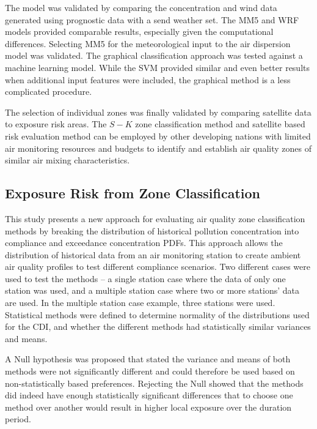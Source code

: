 The model was validated by comparing the concentration and wind data generated using prognostic data with a send weather set. The MM5 and WRF models provided comparable results, especially given the computational differences. Selecting MM5 for the meteorological input to the air dispersion model was validated. The graphical classification approach was tested against a machine learning model. While the SVM provided similar and even better results when additional input features were included, the graphical method is a less complicated procedure.

The selection of individual zones was finally validated by comparing satellite data to exposure risk areas.  The $S-K$ zone classification method and satellite based risk evaluation method can be employed by other developing nations with limited air monitoring resources and budgets to identify and establish air quality zones of similar air mixing characteristics.

\subsection{Exposure Risk from Zone Classification}

This study presents a new approach for evaluating air quality zone classification methods by breaking the distribution of historical pollution concentration into compliance and exceedance concentration PDFs. This approach allows the distribution of historical data from an air monitoring station to create ambient air quality profiles to test different compliance scenarios. Two different cases were used to test the methods – a single station case where the data of only one station was used, and a multiple station case where two or more stations’ data are used. In the multiple station case example, three stations were used. Statistical methods were defined to determine normality of the distributions used for the CDI, and whether the different methods had statistically similar variances and means.

A Null hypothesis was proposed that stated the variance and means of both methods were not significantly different and could therefore be used based on non-statistically based preferences. Rejecting the Null showed that the methods did indeed have enough statistically significant differences that to choose one method over another would result in higher local exposure over the duration period. 

